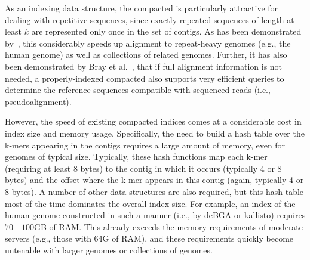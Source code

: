 

As an indexing data structure, the compacted \dbg is particularly attractive for
dealing with repetitive sequences, since exactly repeated sequences of length at
least $k$ are represented only once in the set of contigs. As has been
demonstrated by~\cite{liu2016debga}, this considerably speeds up alignment
to repeat-heavy genomes (e.g., the human genome) as well as collections of
related genomes. Further, it has also been demonstrated by Bray et al.~\cite{Bray2016Kallisto}, 
that if full alignment information is not needed, a
properly-indexed compacted \dbg also supports very efficient queries to
determine the reference sequences compatible with sequenced reads (i.e.,
pseudoalignment).

However, the speed of existing compacted \dbg indices comes at a considerable
cost in index size and memory usage. Specifically, the need to build a hash
table over the k-mers appearing in the \dbg contigs requires a large amount of
memory, even for genomes of typical size. Typically, these hash functions map
each k-mer (requiring at least 8 bytes) to the contig in which it occurs
(typically 4 or 8 bytes) and the offset where the k-mer appears in this contig
(again, typically 4 or 8 bytes). A number of other data structures are also
required, but this hash table most of the time dominates the overall index size. For
example, an index of the human genome constructed in such a manner (i.e., by
deBGA or kallisto) requires $70$---$100$GB of RAM. This already exceeds the
memory requirements of moderate servers (e.g., those with 64G of RAM), and these
requirements quickly become untenable with larger genomes or collections of
genomes.

